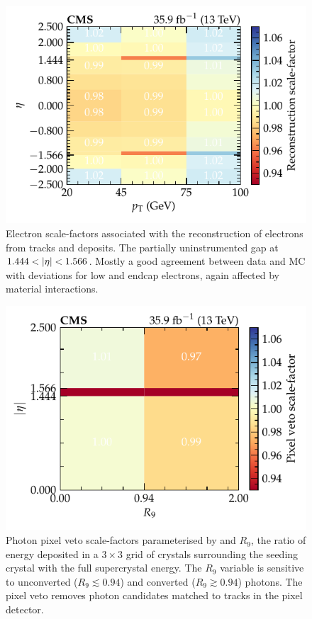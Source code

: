 \begin{figure}[htb]
    \centering
    \includegraphics{chapters/041_corrections/images/efficiencies/objects/electrons/electron_reco_sf.pdf}
    \caption[Corrections to simulated electron reconstruction efficiency.]{
        Electron scale-factors associated with the reconstruction of electrons from tracks and \ECAL deposits. The \ECAL partially uninstrumented gap at ${1.444<\aeta<1.566}$. Mostly a good agreement between data and MC with deviations for low \pt and endcap electrons, again affected by material interactions.
    }
    \label{fig:electron-reco-efficiency}
\end{figure}

\begin{figure}[htb]
    \centering
    \includegraphics{chapters/041_corrections/images/efficiencies/objects/photons/photon_pixelveto_sf.pdf}
    \caption[Corrections to photon pixel veto efficiency.]{
        Photon pixel veto scale-factors parameterised by \aeta and $R_9$, the ratio of energy deposited in a $3\times 3$ grid of crystals surrounding the seeding crystal with the full supercrystal energy. The $R_9$ variable is sensitive to unconverted ($R_9\lesssim 0.94$) and converted ($R_9\gtrsim 0.94$) photons. The pixel veto removes photon candidates matched to tracks in the pixel detector.
    }
    \label{fig:photon-trackveto-efficiency}
\end{figure}

